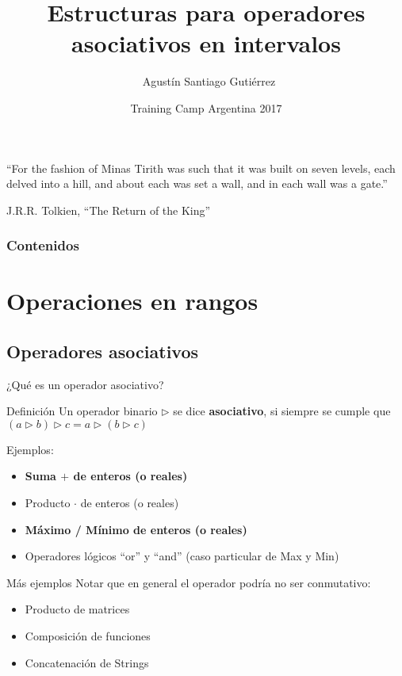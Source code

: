 \documentclass{beamer}
\title[Estructuras] %
{Estructuras para operadores asociativos en intervalos}
\author[Agustín Gutiérrez] %
{~Agustín Santiago Gutiérrez}
\institute[UBA] %
{
  Facultad de Ciencias Exactas y Naturales\\
  Universidad de Buenos Aires
}
\date[TC Arg 2017] %
{Training Camp Argentina 2017}
\begin{document}
\begin{frame}
  \titlepage
\end{frame}


\begin{frame}

``For the fashion of Minas Tirith was such that it was built on seven levels,
each delved into a hill, and about each was set a wall, and in each wall
was a gate.''

\hfill		J.R.R. Tolkien, ``The Return of the King''

\end{frame}

\begin{frame} 
\footnotesize
\frametitle{Contenidos} 
\begin{multicols}{2} 
\tableofcontents 
\end{multicols} 
\end{frame}

\section{Operaciones en rangos} %

\subsection{Operadores asociativos}

\begin{frame}{¿Qué es un operador asociativo?}
  \begin{block}{Definición}
    Un operador binario $\triangleright$ se dice \textbf{asociativo}, si siempre se cumple que $(a \triangleright b) \triangleright c = a \triangleright (b \triangleright c)$
  \end{block}
  \pause
  Ejemplos:
  \begin{itemize}
  \item \textbf{Suma $+$ de enteros (o reales)}
  \item Producto $\cdot$ de enteros (o reales)
  \item \textbf{Máximo / Mínimo de enteros (o reales)}
  \item Operadores lógicos ``or'' y ``and'' (caso particular de Max y Min)
  \end{itemize}
  
\end{frame}

\begin{frame}{Más ejemplos}
  Notar que en general el operador podría no ser conmutativo:
  \begin{itemize}
  \item Producto de matrices
  \item Composición de funciones
  \item Concatenación de Strings
  \end{itemize}
  
\end{frame}
\end{document}
